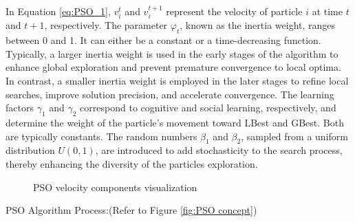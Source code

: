 \hspace*{8mm} In Equation \eqref{eq:PSO_1}, $v_i^{t}$ and $v_i^{t+1}$ represent the velocity of particle $i$ at time $t$ and $t+1$, respectively. The parameter $\varphi_{t}$, known as the inertia weight, ranges between 0 and 1. It can either be a constant or a time-decreasing function. Typically, a larger inertia weight is used in the early stages of the algorithm to enhance global exploration and prevent premature convergence to local optima. In contrast, a smaller inertia weight is employed in the later stages to refine local searches, improve solution precision, and accelerate convergence. The learning factors $\gamma_1$ and $\gamma_2$ correspond to cognitive and social learning, respectively, and determine the weight of the particle's movement toward LBest and GBest. Both are typically constants. The random numbers $\beta_1$ and $\beta_2$, sampled from a uniform distribution $U(0,1)$, are introduced to add stochasticity to the search process, thereby enhancing the diversity of the particles exploration.

\begin{figure}[H]
    \caption{PSO velocity components visualization}
\label{fig:PSO velocity}
\end{figure}

PSO Algorithm Process:(Refer to Figure \ref{fig:PSO concept})

